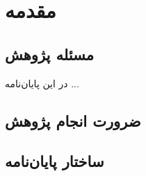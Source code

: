 \chapter{مقدمه}


\section{مسئله پژوهش}
در این پایان‌نامه  ...

\cite{aa}
\section{ضرورت انجام پژوهش}
\section{ساختار پایان‌نامه}


